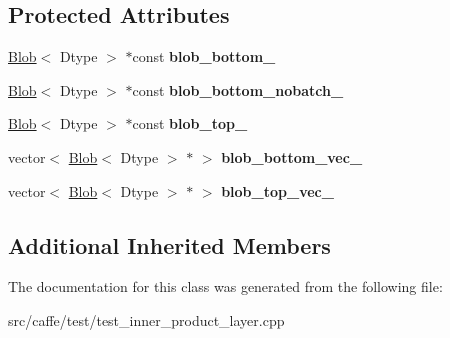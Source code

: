 \subsection*{Protected Attributes}
\begin{DoxyCompactItemize}
\item 
\mbox{\label{classcaffe_1_1_inner_product_layer_test_ae5aa6374869ce4f39782693b03334ec8}} 
\mbox{\hyperlink{classcaffe_1_1_blob}{Blob}}$<$ Dtype $>$ $\ast$const {\bfseries blob\+\_\+bottom\+\_\+}
\item 
\mbox{\label{classcaffe_1_1_inner_product_layer_test_ada95a9caf067057c7248bda28400af64}} 
\mbox{\hyperlink{classcaffe_1_1_blob}{Blob}}$<$ Dtype $>$ $\ast$const {\bfseries blob\+\_\+bottom\+\_\+nobatch\+\_\+}
\item 
\mbox{\label{classcaffe_1_1_inner_product_layer_test_a7da4ac5f1441ca626abe666cd6639bf1}} 
\mbox{\hyperlink{classcaffe_1_1_blob}{Blob}}$<$ Dtype $>$ $\ast$const {\bfseries blob\+\_\+top\+\_\+}
\item 
\mbox{\label{classcaffe_1_1_inner_product_layer_test_ac437d9d2a0025d9d5b5c002904a3883e}} 
vector$<$ \mbox{\hyperlink{classcaffe_1_1_blob}{Blob}}$<$ Dtype $>$ $\ast$ $>$ {\bfseries blob\+\_\+bottom\+\_\+vec\+\_\+}
\item 
\mbox{\label{classcaffe_1_1_inner_product_layer_test_acf7224e372656083692078b05b697205}} 
vector$<$ \mbox{\hyperlink{classcaffe_1_1_blob}{Blob}}$<$ Dtype $>$ $\ast$ $>$ {\bfseries blob\+\_\+top\+\_\+vec\+\_\+}
\end{DoxyCompactItemize}
\subsection*{Additional Inherited Members}


The documentation for this class was generated from the following file\+:\begin{DoxyCompactItemize}
\item 
src/caffe/test/test\+\_\+inner\+\_\+product\+\_\+layer.\+cpp\end{DoxyCompactItemize}
